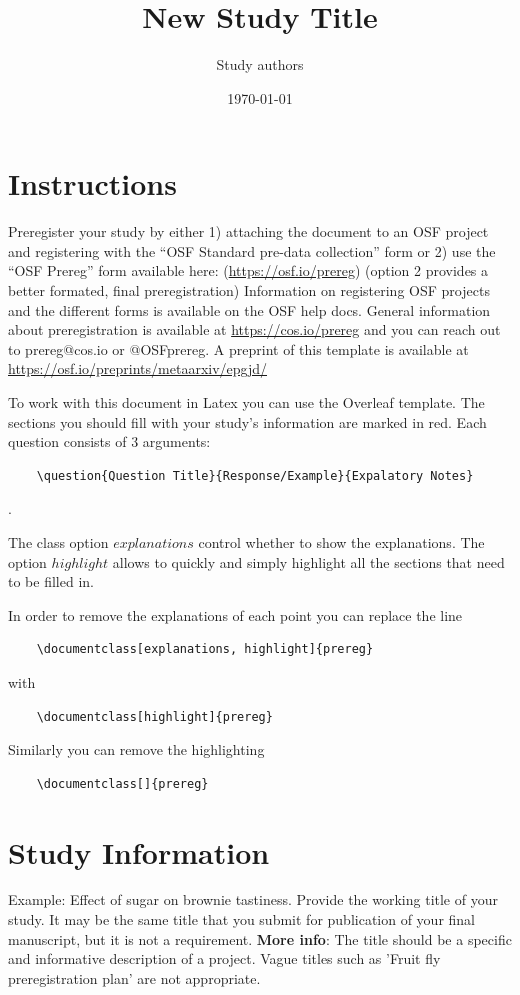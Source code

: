 \documentclass[highlight, explanations]{prereg}
\title{New Study Title}
\author{Study authors}
\date{\today}
\begin{document}
\maketitle


\section{Instructions}
Preregister your study by either 1) attaching the document to an OSF project and registering with the “OSF Standard pre-data collection” form or 2) use the “OSF Prereg” form available here: (\url{https://osf.io/prereg}) (option 2 provides a better formated, final preregistration) 
Information on registering OSF projects and the different forms is available on the OSF help docs.
General information about preregistration is available at \url{https://cos.io/prereg} and you can reach out to prereg@cos.io or @OSFprereg. A preprint of this template is available at \url{https://osf.io/preprints/metaarxiv/epgjd/}

To work with this document in Latex you can use the Overleaf template. 
The sections you should fill with your study's information are marked in red. 
Each question consists of 3 arguments:
\begin{verbatim}
    \question{Question Title}{Response/Example}{Expalatory Notes}
\end{verbatim}.

The class option $explanations$ control whether to show the explanations. The option $highlight$ allows to quickly and simply highlight all the sections that need to be filled in.

In order to remove the explanations of each point you can replace the line
\begin{verbatim}
    \documentclass[explanations, highlight]{prereg}
\end{verbatim}
 with 
 \begin{verbatim}
    \documentclass[highlight]{prereg}
\end{verbatim}

Similarly you can remove the highlighting
\begin{verbatim}
    \documentclass[]{prereg}
\end{verbatim}


\section{Study Information}

{Example: Effect of sugar on brownie tastiness.}
{Provide the working title of your study. It may be the same title that you submit for publication of your final manuscript, but it is not a requirement.
\textbf{More info}: The title should be a specific and informative description of a project. Vague titles such as 'Fruit fly preregistration plan' are not appropriate.}
\end{document}
